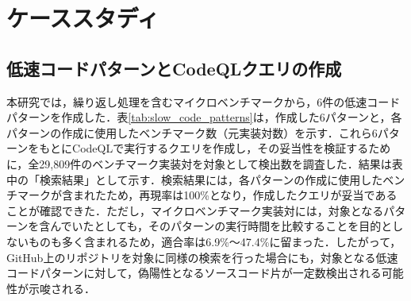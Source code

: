 \documentclass[submit,techrep,noauthor]{ipsj}
\begin{document}
\section{ケーススタディ}
\label{sec:case-study}

\subsection{低速コードパターンとCodeQLクエリの作成}

本研究では，繰り返し処理を含むマイクロベンチマークから，6件の低速コードパターンを作成した．表\ref{tab:slow_code_patterns}は，作成した6パターンと，各パターンの作成に使用したベンチマーク数（元実装対数）を示す．これら6パターンをもとにCodeQLで実行するクエリを作成し，その妥当性を検証するために，全29,809件のベンチマーク実装対を対象として検出数を調査した．結果は表中の「検索結果」として示す．検索結果には，各パターンの作成に使用したベンチマークが含まれたため，再現率は100\%となり，作成したクエリが妥当であることが確認できた．ただし，マイクロベンチマーク実装対には，対象となるパターンを含んでいたとしても，そのパターンの実行時間を比較することを目的としないものも多く含まれるため，適合率は6.9\%～47.4\%に留まった．したがって，GitHub上のリポジトリを対象に同様の検索を行った場合にも，対象となる低速コードパターンに対して，偽陽性となるソースコード片が一定数検出される可能性が示唆される．
\end{document}
